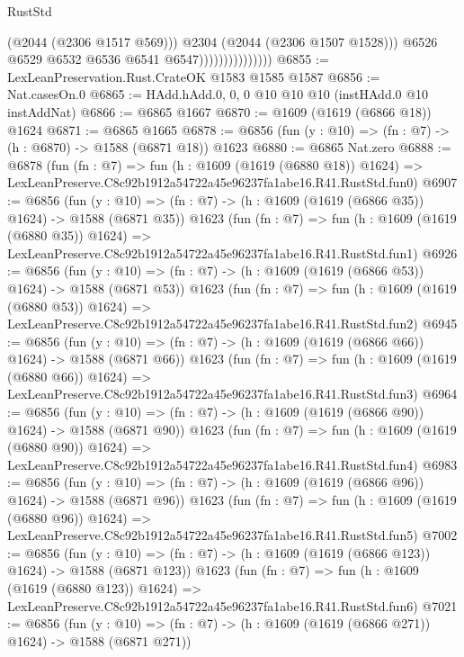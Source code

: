 \begin{lexlean}{RustStd}
\begin{coremodule}
                                      (@2044 (@2306 @1517 @569)))
                                    @2304
                                    (@2044 (@2306 @1507 @1528)))
                                  @6526
                                  @6529
                                  @6532
                                  @6536
                                  @6541
                                  @6547)))))))))))))))
@6855 := LexLeanPreservation.Rust.CrateOK @1583 @1585 @1587
@6856 := Nat.casesOn.{0}
@6865 := HAdd.hAdd.{0, 0, 0} @10 @10 @10 (instHAdd.{0} @10 instAddNat)
@6866 := @6865 @1667
@6870 := @1609 (@1619 (@6866 @18)) @1624
@6871 := @6865 @1665
@6878 := @6856 (fun (y : @10) => (fn : @7) -> (h : @6870) -> @1588 (@6871 @18)) @1623
@6880 := @6865 Nat.zero
@6888 := @6878
    (fun (fn : @7) =>
    fun (h : @1609 (@1619 (@6880 @18)) @1624) =>
    LexLeanPreserve.C8c92b1912a54722a45e96237fa1abe16.R41.RustStd.fun0)
@6907 := @6856
    (fun (y : @10) => (fn : @7) -> (h : @1609 (@1619 (@6866 @35)) @1624) -> @1588 (@6871 @35))
    @1623
    (fun (fn : @7) =>
    fun (h : @1609 (@1619 (@6880 @35)) @1624) =>
    LexLeanPreserve.C8c92b1912a54722a45e96237fa1abe16.R41.RustStd.fun1)
@6926 := @6856
    (fun (y : @10) => (fn : @7) -> (h : @1609 (@1619 (@6866 @53)) @1624) -> @1588 (@6871 @53))
    @1623
    (fun (fn : @7) =>
    fun (h : @1609 (@1619 (@6880 @53)) @1624) =>
    LexLeanPreserve.C8c92b1912a54722a45e96237fa1abe16.R41.RustStd.fun2)
@6945 := @6856
    (fun (y : @10) => (fn : @7) -> (h : @1609 (@1619 (@6866 @66)) @1624) -> @1588 (@6871 @66))
    @1623
    (fun (fn : @7) =>
    fun (h : @1609 (@1619 (@6880 @66)) @1624) =>
    LexLeanPreserve.C8c92b1912a54722a45e96237fa1abe16.R41.RustStd.fun3)
@6964 := @6856
    (fun (y : @10) => (fn : @7) -> (h : @1609 (@1619 (@6866 @90)) @1624) -> @1588 (@6871 @90))
    @1623
    (fun (fn : @7) =>
    fun (h : @1609 (@1619 (@6880 @90)) @1624) =>
    LexLeanPreserve.C8c92b1912a54722a45e96237fa1abe16.R41.RustStd.fun4)
@6983 := @6856
    (fun (y : @10) => (fn : @7) -> (h : @1609 (@1619 (@6866 @96)) @1624) -> @1588 (@6871 @96))
    @1623
    (fun (fn : @7) =>
    fun (h : @1609 (@1619 (@6880 @96)) @1624) =>
    LexLeanPreserve.C8c92b1912a54722a45e96237fa1abe16.R41.RustStd.fun5)
@7002 := @6856
    (fun (y : @10) => (fn : @7) -> (h : @1609 (@1619 (@6866 @123)) @1624) -> @1588 (@6871 @123))
    @1623
    (fun (fn : @7) =>
    fun (h : @1609 (@1619 (@6880 @123)) @1624) =>
    LexLeanPreserve.C8c92b1912a54722a45e96237fa1abe16.R41.RustStd.fun6)
@7021 := @6856
    (fun (y : @10) => (fn : @7) -> (h : @1609 (@1619 (@6866 @271)) @1624) -> @1588 (@6871 @271))

\end{coremodule}
\end{lexlean}
